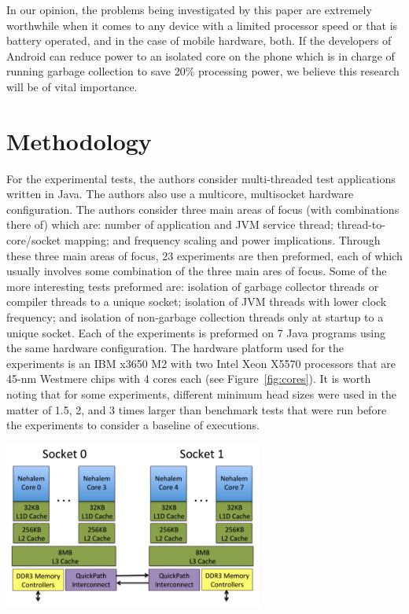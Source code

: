 \documentclass[conference]{IEEEtran}
\begin{document}
In our opinion, the problems being investigated by this paper are extremely worthwhile when
it comes to any device with a limited processor speed or that is battery operated, and in the
case of mobile hardware, both. If the developers of Android can reduce power to an isolated
core on the phone which is in charge of running garbage collection to save 20\% processing
power, we believe this research will be of vital importance.

\section{Methodology}

For the experimental tests, the authors consider multi-threaded test applications written in
Java. The authors also use a multicore, multisocket hardware configuration. The authors 
consider three main areas of focus (with combinations there of) which are: number of application
and JVM service thread; thread-to-core/socket mapping; and frequency scaling and power implications.
Through these three main areas of focus, 23 experiments are then preformed, each of which usually
involves some combination of the three main ares of focus. Some of the more interesting tests preformed 
are: isolation of garbage collector threads or compiler threads to a unique socket; isolation of
JVM threads with lower clock frequency; and isolation of non-garbage collection threads only 
at startup to a unique socket. Each of the experiments is preformed on 7 Java programs using
the same hardware configuration. The hardware platform used for the experiments is an IBM
x3650 M2 with two Intel Xeon X5570 processors that are 45-nm Westmere chips with 4 cores each
(see Figure~\ref{fig:cores}). It is worth noting that for some experiments, different minimum
head sizes were used in the matter of 1.5, 2, and 3 times larger than benchmark tests that were
run before the experiments to consider a baseline of executions.

\begin{center}
\includegraphics[height=55mm]{images/hardware}
\end{center}
\end{document}

